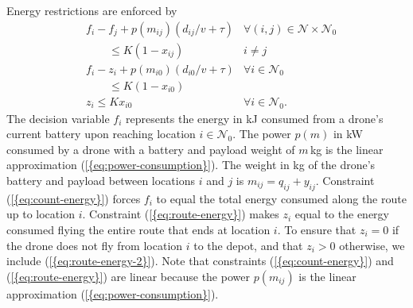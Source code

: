 \documentclass[journal]{IEEEtran}
\begin{document}
Energy restrictions are enforced by
\begin{subequations}
\label{eq:energy-constraints}
\begin{align}
& {\ensuremath{f_{{i}}}} - {\ensuremath{f_{{j}}}} + {\ensuremath{p({ {\ensuremath{m_{{i} {j}}}} })}}\left( {\ensuremath{d_{{i} {j}}}} / {\ensuremath{v}} + {\ensuremath{\tau}} \right) &  {\ensuremath{\forall({i},{j}) \in {\ensuremath{\mathcal{N}}} \times {\ensuremath{{\ensuremath{\mathcal{N}}}_{0}}}}} \label{eq:count-energy} \\
& \qquad \leq {\ensuremath{{\ensuremath{K}} \left(1 - {\ensuremath{x_{{{i}} {{j}}}}}\right) }} & i \neq j \nonumber \\
& {\ensuremath{f_{{i}}}} - {\ensuremath{z_{{i}}}} + {\ensuremath{p({ {\ensuremath{m_{{i} {0}}}} })}}\left( {\ensuremath{d_{{i} {0}}}} / {\ensuremath{v}} + {\ensuremath{\tau}} \right) & {\ensuremath{\forall {i} \in {\ensuremath{{\ensuremath{\mathcal{N}}}_{0}}}}} \label{eq:route-energy} \\
& \qquad \leq {\ensuremath{{\ensuremath{K}} \left(1 - {\ensuremath{x_{{{i}} {{0}}}}}\right) }} & \nonumber \\
& {\ensuremath{z_{{i}}}} \leq {\ensuremath{K}} {\ensuremath{x_{{i} {0}}}} & {\ensuremath{\forall {i} \in {\ensuremath{{\ensuremath{\mathcal{N}}}_{0}}}}}. \label{eq:route-energy-2}
\end{align}
\end{subequations}
The decision variable ${\ensuremath{f_{{i}}}}$ represents the energy in kJ consumed from a drone's current battery upon reaching location $i \in {\ensuremath{{\ensuremath{\mathcal{N}}}_{0}}}$. The power ${\ensuremath{p({\ensuremath{m}})}}$ in kW consumed by a drone with a battery and payload weight of ${\ensuremath{m}}$\,kg is the linear approximation {(\ref{{eq:power-consumption}})}. The weight in kg of the drone's battery and payload between locations $i$ and $j$ is ${\ensuremath{m_{{i} {j}}}} = {\ensuremath{q_{{i} {j}}}} + {\ensuremath{{\ensuremath{y}}_{{i} {j}}}}.$ Constraint {(\ref{{eq:count-energy}})} forces ${\ensuremath{f_{{i}}}}$ to equal the total energy consumed along the route up to location $i$. Constraint {(\ref{{eq:route-energy}})} makes ${\ensuremath{z_{{i}}}}$ equal to the energy consumed flying the entire route that ends at location $i$. To ensure that ${\ensuremath{z_{{i}}}}=0$ if the drone does not fly from location $i$ to the depot, and that ${\ensuremath{z_{{i}}}}>0$ otherwise, we include {(\ref{{eq:route-energy-2}})}. Note that constraints {(\ref{{eq:count-energy}})} and {(\ref{{eq:route-energy}})} are linear because the power ${\ensuremath{p({ {\ensuremath{m_{{i} {j}}}} })}}$ is the linear approximation {(\ref{{eq:power-consumption}})}.
\end{document}

